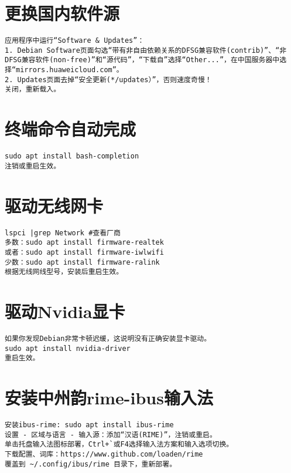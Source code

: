 \documentclass[a4paper,fontset=fandol,zihao=-4,linespread=1.2,oneside]{ctexbook}
\begin{document}
\section{更换国内软件源}
\begin{lstlisting}
应用程序中运行“Software & Updates”：
1. Debian Software页面勾选“带有非自由依赖关系的DFSG兼容软件(contrib)”、“非DFSG兼容软件(non-free)”和“源代码”，“下载自”选择“Other...”，在中国服务器中选择“mirrors.huaweicloud.com”。
2. Updates页面去掉“安全更新(*/updates）”，否则速度奇慢！
关闭，重新载入。
\end{lstlisting}

\section{终端命令自动完成}
\begin{lstlisting}
sudo apt install bash-completion
注销或重启生效。
\end{lstlisting}

\section{驱动无线网卡}
\begin{lstlisting}
lspci |grep Network #查看厂商
多数：sudo apt install firmware-realtek
或者：sudo apt install firmware-iwlwifi
少数：sudo apt install firmware-ralink
根据无线网线型号，安装后重启生效。
\end{lstlisting}

\section{驱动Nvidia显卡}
\begin{lstlisting}
如果你发现Debian非常卡顿迟缓，这说明没有正确安装显卡驱动。
sudo apt install nvidia-driver
重启生效。
\end{lstlisting}

\section{安装中州韵rime-ibus输入法}
\begin{lstlisting}
安装ibus-rime: sudo apt install ibus-rime
设置 - 区域与语言 - 输入源：添加“汉语(RIME)”，注销或重启。
单击托盘输入法图标部署，Ctrl+`或F4选择输入法方案和输入选项切换。
下载配置、词库：https://www.github.com/loaden/rime
覆盖到 ~/.config/ibus/rime 目录下，重新部署。
\end{lstlisting}
\end{document}
